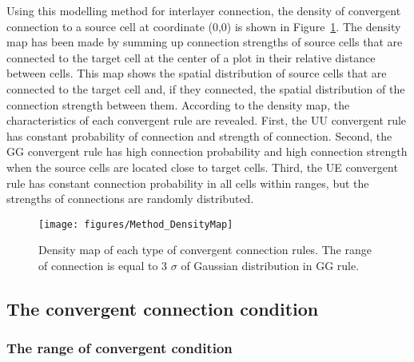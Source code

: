 \begin{enumerate}
\begin{enumerate}
      \end{enumerate}
   \end{enumerate}

Using this modelling method for interlayer connection, the density of convergent connection to a source cell at coordinate (0,0) is shown in Figure~\ref{fig:DenseMap}. The density map has been made by summing up connection strengths of source cells that are connected to the target cell at the center of a plot in their relative distance between cells. This map shows the spatial distribution of source cells that are connected to the target cell and, if they connected, the spatial distribution of the connection strength between them. According to the density map, the characteristics of each convergent rule are revealed. First, the UU convergent rule has constant probability of connection and strength of connection. Second, the GG convergent rule has high connection probability and high connection strength when the source cells are located close to target cells. Third, the UE convergent rule has constant connection probability in all cells within ranges, but the strengths of connections are randomly distributed.



\begin{figure}[!h]
	\centering
	\texttt{[image: figures/Method\_DensityMap]}
	\caption{Density map of each type of convergent connection rules. The range of connection is equal to 3 $\sigma$ of Gaussian distribution in GG rule.}
	\label{fig:DenseMap}
\end{figure} 


\subsection{The convergent connection condition}
\subsubsection{The range of convergent condition}

